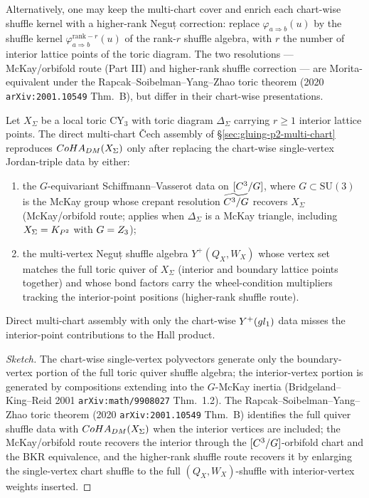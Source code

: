 Alternatively, one may keep the multi-chart cover and enrich each
chart-wise shuffle kernel with a higher-rank Neguț correction: replace
$\varphi_{a \Rightarrow b}(u)$ by the shuffle kernel
$\varphi_{a \Rightarrow b}^{\mathrm{rank-}r}(u)$ of the rank-$r$ shuffle
algebra, with $r$ the number of interior lattice points of the toric
diagram.  The two resolutions --- McKay/orbifold route (Part III) and
higher-rank shuffle correction --- are Morita-equivalent under the
Rapcak--Soibelman--Yang--Zhao toric theorem (2020
\texttt{arXiv:2001.10549} Thm.~B), but differ in their chart-wise
presentations.

\begin{proposition}
\label{prop:compact-cycle-obstruction}
Let $X_\Sigma$ be a local toric CY$_3$ with toric diagram $\Delta_\Sigma$
carrying $r \geq 1$ interior lattice points.  The direct multi-chart
\v{C}ech assembly of \S\ref{sec:gluing-p2-multi-chart} reproduces
$CoHA_{DM}(X_\Sigma)$ only after replacing the chart-wise
single-vertex Jordan-triple data by either:
\begin{enumerate}[label=\emph{(\alph*)}, leftmargin=2em]
\item the $G$-equivariant Schiffmann--Vasserot data on $[C^3 / G]$,
  where $G \subset \mathrm{SU}(3)$ is the McKay group whose crepant
  resolution $\widetilde{C^3/G}$ recovers $X_\Sigma$ (McKay/orbifold
  route; applies when $\Delta_\Sigma$ is a McKay triangle, including
  $X_\Sigma = K_{P^2}$ with $G = Z_3$);
\item the multi-vertex Neguț shuffle algebra $Y^+(Q_X, W_X)$ whose
  vertex set matches the full toric quiver of $X_\Sigma$ (interior and
  boundary lattice points together) and whose bond factors carry the
  wheel-condition multipliers tracking the interior-point positions
  (higher-rank shuffle route).
\end{enumerate}
Direct multi-chart assembly with only the chart-wise $Y^+(gl_1)$
data misses the interior-point contributions to the Hall product.
\end{proposition}

\begin{proof}[Sketch]
The chart-wise single-vertex polyvectors generate only the
boundary-vertex portion of the full toric quiver shuffle algebra; the
interior-vertex portion is generated by compositions extending into the
$G$-McKay inertia (Bridgeland--King--Reid 2001 \texttt{arXiv:math/9908027}
Thm.~1.2).  The Rapcak--Soibelman--Yang--Zhao toric theorem (2020
\texttt{arXiv:2001.10549} Thm.~B) identifies the full quiver shuffle
data with $CoHA_{DM}(X_\Sigma)$ when the interior vertices are
included; the McKay/orbifold route recovers the interior through the
$[C^3/G]$-orbifold chart and the BKR equivalence, and the higher-rank
shuffle route recovers it by enlarging the single-vertex chart shuffle
to the full $(Q_X, W_X)$-shuffle with interior-vertex weights inserted.
\end{proof}

